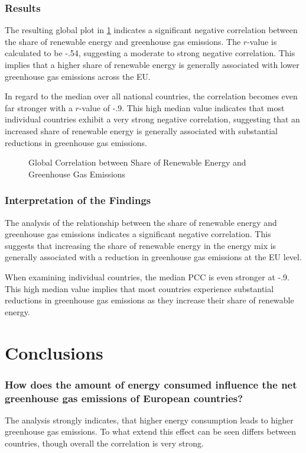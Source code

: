 \documentclass{article}
\begin{document}
\subsubsection*{Results}
The resulting global plot in \cref{plt:global_share_vs_emissions} indicates a significant negative correlation between the share
of renewable energy and greenhouse gas emissions. The $r$-value is calculated to be -.54, suggesting a moderate to strong
negative correlation. This implies that a higher share of renewable energy is generally associated with lower greenhouse gas emissions across the EU.

In regard to the median over all national countries, the correlation becomes even far stronger with a $r$-value of -.9.
This high median value indicates that most individual countries exhibit a very strong negative correlation,
suggesting that an increased share of renewable energy is generally associated with substantial reductions in greenhouse gas emissions.

\begin{figure}
    \centering
    \resizebox{.7\textwidth}{!}{}
    \caption{Global Correlation between Share of Renewable Energy and Greenhouse Gas Emissions}
    \label{plt:global_share_vs_emissions}
\end{figure}

\subsubsection*{Interpretation of the Findings}
The analysis of the relationship between the share of renewable energy and greenhouse gas emissions indicates a significant negative correlation.
This suggests that increasing the share of renewable energy in the energy mix is generally associated with a reduction in greenhouse gas
emissions at the EU level.

When examining individual countries, the median PCC is even stronger at -.9. This high median value implies that most countries experience
substantial reductions in greenhouse gas emissions as they increase their share of renewable energy.

\section*{Conclusions}
\subsubsection*{How does the amount of energy consumed influence the net greenhouse gas emissions of European countries?}
The analysis strongly indicates, that higher energy consumption leads to higher greenhouse gas emissions.
To what extend this effect can be seen differs between countries, though overall the correlation is very strong.
\end{document}
